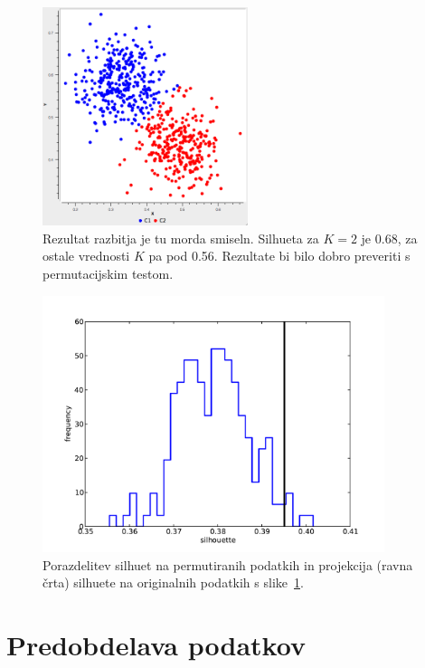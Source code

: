 \begin{figure}[htbp]
\begin{center}
  \includegraphics[width=6cm]{slike/kmeans-two-overlap.png}
\caption{Rezultat razbitja je tu morda smiseln. Silhueta za $K=2$ je
  0.68, za ostale vrednosti $K$ pa pod 0.56. Rezultate bi bilo dobro
  preveriti s permutacijskim testom.}
\label{f-kmeans-two-overlap}
\end{center}
\end{figure}

\begin{figure}[htbp]
\begin{center}
  \includegraphics[width=10cm]{slike/kmeans-permutations-two.pdf}
\caption{Porazdelitev silhuet na permutiranih podatkih in projekcija
  (ravna črta) silhuete na originalnih podatkih s slike~\ref{f-kmeans-two-overlap}.}
\label{f-kmeans-permutations-two}
\end{center}
\end{figure}

\section{Predobdelava podatkov}

